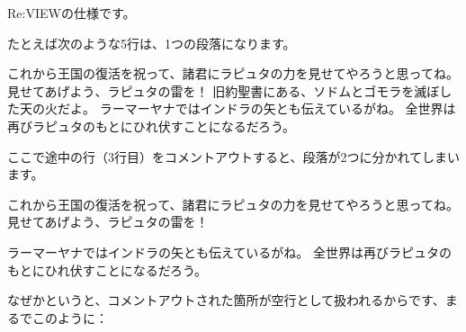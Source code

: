 Re:VIEWの仕様です。

たとえば次のような5行は、1つの段落になります。

\begin{starterprogram}\end{starterprogram}
\noindent
{}

\starterresult

これから王国の復活を祝って、諸君にラピュタの力を見せてやろうと思ってね。
見せてあげよう、ラピュタの雷を！
旧約聖書にある、ソドムとゴモラを滅ぼした天の火だよ。
ラーマーヤナではインドラの矢とも伝えているがね。
全世界は再びラピュタのもとにひれ伏すことになるだろう。

\endstarterresult

ここで途中の行（3行目）をコメントアウトすると、段落が2つに分かれてしまいます。

\begin{starterprogram}\end{starterprogram}
\noindent
{}

\starterresult

これから王国の復活を祝って、諸君にラピュタの力を見せてやろうと思ってね。
見せてあげよう、ラピュタの雷を！

ラーマーヤナではインドラの矢とも伝えているがね。
全世界は再びラピュタのもとにひれ伏すことになるだろう。

\endstarterresult

なぜかというと、コメントアウトされた箇所が空行として扱われるからです、まるでこのように：

\begin{starterprogram}\end{starterprogram}


